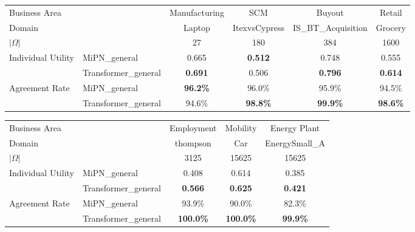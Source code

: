 \begin{tabular}{llcccc}
\toprule
Business Area &  & Manufacturing & SCM & Buyout & Retail \\
Domain &  & Laptop & ItexvsCypress & IS_BT_Acquisition & Grocery \\
$|\Omega|$ &  & 27 & 180 & 384 & 1600 \\
\midrule
Individual Utility & MiPN_general & 0.665 & \textbf{0.512} & 0.748 & 0.555 \\
 & Transformer_general & \textbf{0.691} & 0.506 & \textbf{0.796} & \textbf{0.614} \\
\midrule
Agreement Rate & MiPN_general & \textbf{96.2\%} & 96.0\% & 95.9\% & 94.5\% \\
 & Transformer_general & 94.6\% & \textbf{98.8\%} & \textbf{99.9\%} & \textbf{98.6\%} \\
\bottomrule
\end{tabular}

\begin{tabular}{llccc}
\toprule
Business Area &  & Employment & Mobility & Energy Plant \\
Domain &  & thompson & Car & EnergySmall_A \\
$|\Omega|$ &  & 3125 & 15625 & 15625 \\
\midrule
Individual Utility & MiPN_general & 0.408 & 0.614 & 0.385 \\
 & Transformer_general & \textbf{0.566} & \textbf{0.625} & \textbf{0.421} \\
\midrule
Agreement Rate & MiPN_general & 93.9\% & 90.0\% & 82.3\% \\
 & Transformer_general & \textbf{100.0\%} & \textbf{100.0\%} & \textbf{99.9\%} \\
\bottomrule
\end{tabular}
